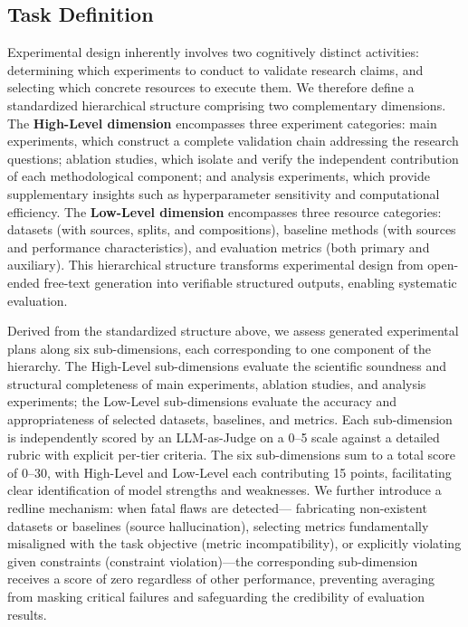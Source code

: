 \documentclass[letterpaper]{article} %
\begin{document}
\subsection{Task Definition}
Experimental design inherently involves two cognitively distinct activities: determining which experiments to 
conduct to validate research claims, and selecting which concrete resources to execute them. We therefore define a standardized 
hierarchical structure comprising two complementary dimensions. The \textbf{High-Level dimension} encompasses three experiment categories: 
main experiments, which construct a complete validation chain addressing the research questions; ablation studies, which isolate and 
verify the independent contribution of each methodological component; and analysis experiments, which provide supplementary insights 
such as hyperparameter sensitivity and computational efficiency. The \textbf{Low-Level dimension} encompasses three resource categories: datasets 
(with sources, splits, and compositions), baseline methods (with sources and performance characteristics), and evaluation metrics 
(both primary and auxiliary). This hierarchical structure transforms experimental design from open-ended free-text generation into 
verifiable structured outputs, enabling systematic evaluation.

Derived from the standardized structure above, we assess generated experimental plans along six sub-dimensions, each corresponding to one component of the hierarchy.
The High-Level sub-dimensions evaluate the scientific soundness and structural completeness of main experiments, ablation studies, and
analysis experiments; the Low-Level sub-dimensions evaluate the accuracy and appropriateness of selected datasets, baselines, and metrics.
Each sub-dimension is independently scored by an LLM-as-Judge on a 0--5 scale against a detailed rubric with explicit per-tier criteria.
The six sub-dimensions sum to a total score of 0--30, with High-Level and Low-Level each contributing 15 points, facilitating clear
identification of model strengths and weaknesses. We further introduce a redline mechanism: when fatal flaws are detected---
fabricating non-existent datasets or baselines (source hallucination), selecting metrics fundamentally misaligned with the task objective
(metric incompatibility), or explicitly violating given constraints (constraint violation)---the corresponding sub-dimension receives a
score of zero regardless of other performance, preventing averaging from masking critical failures and safeguarding the credibility
of evaluation results.
\end{document}
